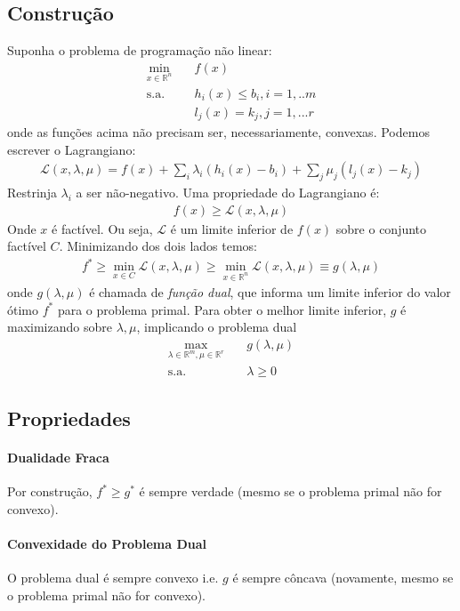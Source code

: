 \subsection{Construção}
Suponha o problema de programação não linear:
\begin{align*}
    \min_{x \in \mathbb{R}^n}&\quad f(x)\\
    \text{s.a.}&\quad h_i(x) \le b_i, i = 1,..m\\
    &\quad l_j(x)  = k_j, j = 1,...r 
\end{align*}
onde as funções acima não precisam ser, necessariamente, convexas. Podemos escrever o Lagrangiano:
\begin{align*}
    \mathcal{L}(x,\lambda,\mu)  = f(x) + \sum_i\lambda_i(h_i(x)-b_i) + \sum_j\mu_j(l_j(x)-k_j)
\end{align*}
Restrinja $\lambda_i$ a ser não-negativo. Uma propriedade do Lagrangiano é:
\begin{align*}
    f(x) \ge \mathcal{L}(x,\lambda,\mu)
\end{align*}
Onde $x$ é factível. Ou seja, $\mathcal{L}$ é um limite inferior de $f(x)$ sobre o conjunto factível $C$. Minimizando dos dois lados temos:
\begin{align*}
    f^* \ge \min_{x \in C}\mathcal{L}(x,\lambda,\mu) \ge \min_{x \in \mathbb{R}^n}\mathcal{L}(x,\lambda,\mu) \equiv g(\lambda,\mu)
\end{align*}
onde $g(\lambda,\mu)$ é chamada de \textit{função dual}, que informa um limite inferior do valor ótimo $f^*$ para o problema primal. Para obter o melhor limite inferior, $g$ é maximizando sobre $\lambda,\mu$, implicando o problema dual
\begin{align*}
    \max_{\lambda \in \mathbb{R}^m, \mu \in \mathbb{R}^r}&\quad g(\lambda,\mu)\\
    \text{s.a.}&\quad \lambda\geq0
\end{align*}

\subsection{Propriedades}
\paragraph{Dualidade Fraca} Por construção, $f^* \ge g^*$  é sempre verdade (mesmo se o problema primal não for convexo).
\paragraph{Convexidade do Problema Dual} O problema dual é sempre convexo i.e. $g$ é sempre côncava (novamente, mesmo se o problema primal não for convexo). 
